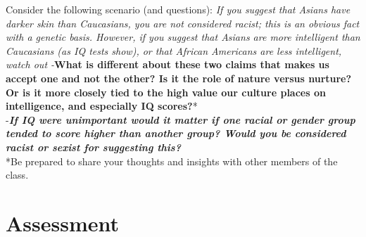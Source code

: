 \documentclass[
]{book}
\begin{document}
\begin{reflect}
Consider the following scenario (and questions):
\emph{If you suggest that Asians have darker skin than Caucasians, you are not considered racist; this is an obvious fact with a genetic basis. However, if you suggest that Asians are more intelligent than Caucasians (as IQ tests show), or that African Americans are less intelligent, watch out
-}\textbf{What is different about these two claims that makes us accept one and not the other? Is it the role of nature versus nurture? Or is it more closely tied to the high value our culture places on intelligence, and especially IQ scores?}*\\
-\textbf{\emph{If IQ were unimportant would it matter if one racial or gender group tended to score higher than another group? Would you be considered racist or sexist for suggesting this?}}\\
*Be prepared to share your thoughts and insights with other members of the class.
\end{reflect}

\hypertarget{assessment-1}{%
\section*{Assessment}\label{assessment-1}}
\end{document}
